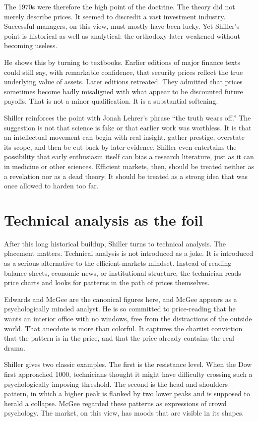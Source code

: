The 1970s were therefore the high point of the doctrine. The theory did not merely describe prices. It seemed to discredit a vast investment industry. Successful managers, on this view, must mostly have been lucky. Yet Shiller's point is historical as well as analytical: the orthodoxy later weakened without becoming useless.

He shows this by turning to textbooks. Earlier editions of major finance texts could still say, with remarkable confidence, that security prices reflect the true underlying value of assets. Later editions retreated. They admitted that prices sometimes become badly misaligned with what appear to be discounted future payoffs. That is not a minor qualification. It is a substantial softening.

Shiller reinforces the point with Jonah Lehrer's phrase ``the truth wears off.'' The suggestion is not that science is fake or that earlier work was worthless. It is that an intellectual movement can begin with real insight, gather prestige, overstate its scope, and then be cut back by later evidence. Shiller even entertains the possibility that early enthusiasm itself can bias a research literature, just as it can in medicine or other sciences. Efficient markets, then, should be treated neither as a revelation nor as a dead theory. It should be treated as a strong idea that was once allowed to harden too far.

\section{Technical analysis as the foil}

After this long historical buildup, Shiller turns to technical analysis. The placement matters. Technical analysis is not introduced as a joke. It is introduced as a serious alternative to the efficient-markets mindset. Instead of reading balance sheets, economic news, or institutional structure, the technician reads price charts and looks for patterns in the path of prices themselves.

Edwards and McGee are the canonical figures here, and McGee appears as a psychologically minded analyst. He is so committed to price-reading that he wants an interior office with no windows, free from the distractions of the outside world. That anecdote is more than colorful. It captures the chartist conviction that the pattern is in the price, and that the price already contains the real drama.

Shiller gives two classic examples. The first is the resistance level. When the Dow first approached 1000, technicians thought it might have difficulty crossing such a psychologically imposing threshold. The second is the head-and-shoulders pattern, in which a higher peak is flanked by two lower peaks and is supposed to herald a collapse. McGee regarded these patterns as expressions of crowd psychology. The market, on this view, has moods that are visible in its shapes.

